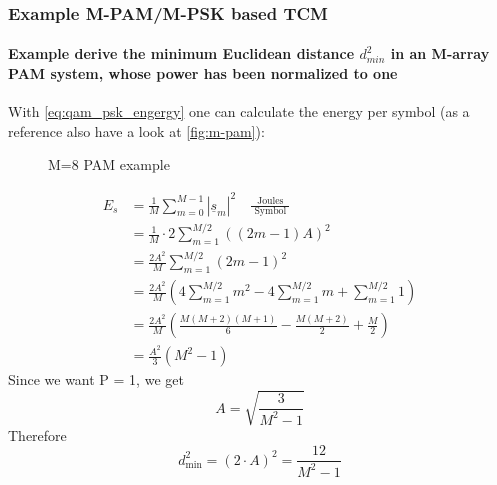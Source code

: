 \subsubsection{Example M-PAM/M-PSK based TCM}
\paragraph{Example derive the minimum Euclidean distance $d^2_{min}$ in an M-array PAM system, whose power has been normalized to one}\mbox{}\newline
\label{par:m-pam_power}
With \autoref{eq:qam_psk_engergy} one can calculate the energy per symbol (as a reference also have a look at \autoref{fig:m-pam}):
\begin{figure}[ht!]
  \centering
  \caption{M=8 PAM example}
  \label{fig:m-pam}
\end{figure}
$$
\begin{aligned}
E_s&=\frac{1}{M} \sum_{m=0}^{M-1}\left|\underline{s}_m\right|^2 \quad \frac{\text { Joules }}{\text { Symbol }}\\
& =\frac{1}{M} \cdot 2 \sum_{m=1}^{M / 2}((2 m-1) A)^2 \\
& =\frac{2 A^2}{M} \sum_{m=1}^{M / 2}(2 m-1)^2 \\
& =\frac{2 A^2}{M}\left(4 \sum_{m=1}^{M / 2} m^2-4 \sum_{m=1}^{M / 2} m+\sum_{m=1}^{M / 2} 1\right) \\
& =\frac{2 A^2}{M}\left(\frac{M(M+2)(M+1)}{6}-\frac{M(M+2)}{2}+\frac{M}{2}\right) \\
& =\frac{A^2}{3}\left(M^2-1\right)
\end{aligned}
$$
Since we want P = 1, we get
$$
A=\sqrt{\frac{3}{M^2-1}}
$$
Therefore 
$$
d_{\min }^2=(2\cdot A)^2=\frac{12}{M^2-1}
$$
